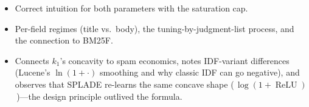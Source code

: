 \begin{interviewq}

\goodgreat
\begin{itemize}
    \item {} Correct intuition for both parameters with the saturation cap.
    \item {} Per-field regimes (title vs.\ body), the tuning-by-judgment-list process, and the connection to BM25F.
    \item {} Connects $k_1$'s concavity to spam economics, notes IDF-variant differences (Lucene's $\ln(1+\cdot)$ smoothing and why classic IDF can go negative), and observes that SPLADE re-learns the same concave shape (\,$\log(1+\operatorname{ReLU})$\,)---the design principle outlived the formula.
\end{itemize}

\end{interviewq}

